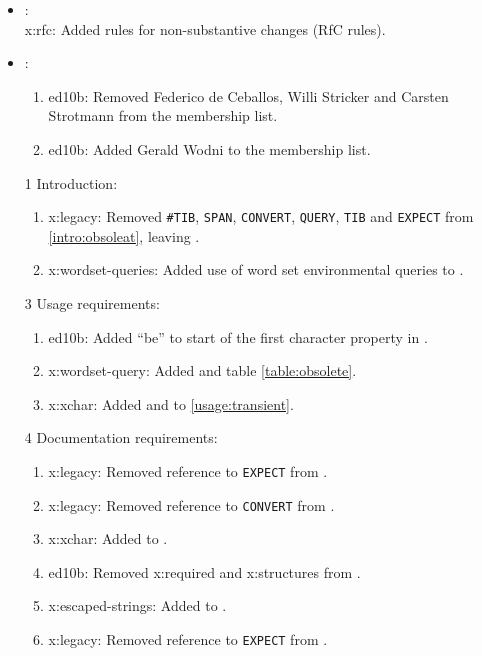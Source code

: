 	\begin{itemize}
	\item {}: \\
		\textsf{x:rfc}: Added rules for non-substantive changes (RfC rules).

	\item {}:
		\begin{enumerate}
		\item \textsf{ed10b}: Removed Federico de Ceballos, Willi Stricker
			and Carsten Strotmann from the \linebreak membership list.
		\item \textsf{ed10b}: Added Gerald Wodni to the membership list.
		\end{enumerate}

	\item[1] Introduction:
		\begin{enumerate}
		\item \textsf{x:legacy}: Removed \texttt{\#TIB}, \texttt{SPAN},
			\texttt{CONVERT}, \texttt{QUERY}, \texttt{TIB} and \texttt{EXPECT}
			from \ref{intro:obsoleat}, leaving .

		\item \textsf{x:wordset-queries}: Added use of word set environmental
			queries to .
		\end{enumerate}

	\item[3] Usage requirements:
		\begin{enumerate}
		\item \textsf{ed10b}: Added ``be'' to start of the first character
			property in .
		\item \textsf{x:wordset-query}: Added  and table
			\ref{table:obsolete}.
		\item \textsf{x:xchar}: Added  and  to
			\ref{usage:transient}.
		\end{enumerate}

	\item[4] Documentation requirements:
		\begin{enumerate}
		\item \textsf{x:legacy}: Removed reference to \texttt{EXPECT} from
			.
		\item \textsf{x:legacy}: Removed reference to \texttt{CONVERT} from
			.
		\item \textsf{x:xchar}: Added  to 
			.
		\item \textsf{ed10b}: Removed \textsf{x:required} and
			\textsf{x:structures} from .
		\item \textsf{x:escaped-strings}: Added  to .
		\item \textsf{x:legacy}: Removed reference to \texttt{EXPECT} from
			.
		\end{enumerate}


\end{itemize}
